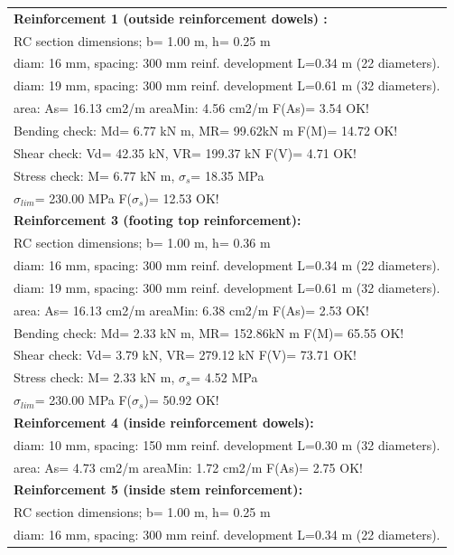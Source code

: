 \begin{center}
\begin{supertabular}[H]{|l|}
\hline
\textbf{Reinforcement 1 (outside reinforcement dowels) :} \\
  RC section dimensions; b= 1.00 m, h= 0.25 m\\
  diam: 16 mm, spacing: 300 mm  reinf. development L=0.34 m (22 diameters).\\
  diam: 19 mm, spacing: 300 mm  reinf. development L=0.61 m (32 diameters).\\
  area: As=  16.13 cm2/m areaMin:   4.56 cm2/m  F(As)= 3.54 OK!\\
  Bending check: Md=   6.77 kN m, MR=  99.62kN m  F(M)= 14.72 OK!\\
  Shear check: Vd=  42.35 kN,  VR= 199.37 kN  F(V)= 4.71 OK!\\
  Stress check: M=   6.77 kN m, $\sigma_s$=  18.35 MPa\\
    $\sigma_{lim}$= 230.00 MPa  F($\sigma_s$)= 12.53 OK!\\
\textbf{Reinforcement 3 (footing top reinforcement):}\\
  RC section dimensions; b= 1.00 m, h= 0.36 m\\
  diam: 16 mm, spacing: 300 mm  reinf. development L=0.34 m (22 diameters).\\
  diam: 19 mm, spacing: 300 mm  reinf. development L=0.61 m (32 diameters).\\
  area: As=  16.13 cm2/m areaMin:   6.38 cm2/m  F(As)= 2.53 OK!\\
  Bending check: Md=   2.33 kN m, MR= 152.86kN m  F(M)= 65.55 OK!\\
  Shear check: Vd=   3.79 kN,  VR= 279.12 kN  F(V)= 73.71 OK!\\
  Stress check: M=   2.33 kN m, $\sigma_s$=   4.52 MPa\\
    $\sigma_{lim}$= 230.00 MPa  F($\sigma_s$)= 50.92 OK!\\
\textbf{Reinforcement 4 (inside reinforcement dowels):}\\
  diam: 10 mm, spacing: 150 mm  reinf. development L=0.30 m (32 diameters).\\
  area: As=   4.73 cm2/m areaMin:   1.72 cm2/m  F(As)= 2.75 OK!\\
\textbf{Reinforcement 5 (inside stem reinforcement):}\\
  RC section dimensions; b= 1.00 m, h= 0.25 m\\
  diam: 16 mm, spacing: 300 mm  reinf. development L=0.34 m (22 diameters).\\

\end{supertabular}
\end{center}
